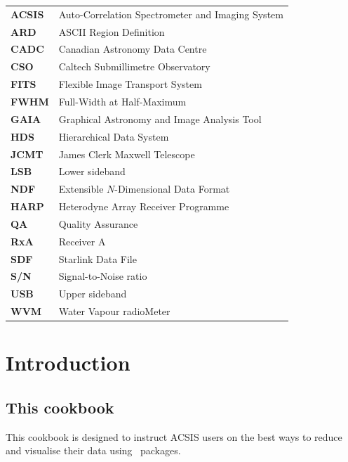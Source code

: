 \documentclass[11pt,oneside,chapters]{starlink}
\begin{document}
\scfrontmatter

\Acronyms

\begin{table}[h!]
\begin{tabular}{ll}
\textbf{ACSIS}& Auto-Correlation Spectrometer and Imaging System\\
\textbf{ARD}& ASCII Region Definition\\
\textbf{CADC}& Canadian Astronomy Data Centre\\
\textbf{CSO}& Caltech Submillimetre Observatory\\
\textbf{FITS}& Flexible Image Transport System\\
\textbf{FWHM}& Full-Width at Half-Maximum\\
\textbf{GAIA}& Graphical Astronomy and Image Analysis Tool\\
\textbf{HDS}& Hierarchical Data System\\
\textbf{JCMT}& James Clerk Maxwell Telescope\\
\textbf{LSB}& Lower sideband\\
\textbf{NDF}& Extensible $N$-Dimensional Data Format\\
\textbf{HARP}& Heterodyne Array Receiver Programme\\
\textbf{QA}& Quality Assurance\\
\textbf{RxA}& Receiver A\\
\textbf{SDF}& Starlink Data File\\
\textbf{S/N}& Signal-to-Noise ratio\\
\textbf{USB}& Upper sideband\\
\textbf{WVM}& Water Vapour radioMeter\\
\end{tabular}
\end{table}


\chapter{Introduction}
\label{sec:intro}

\section{This cookbook}
This cookbook is designed to instruct ACSIS users on the best ways to
reduce and visualise their data using \starlink\ packages.
\end{document}
